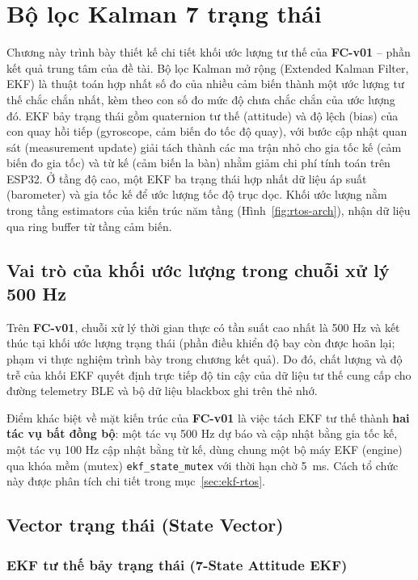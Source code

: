\chapter{Bộ lọc Kalman 7 trạng thái}

Chương này trình bày thiết kế chi tiết khối ước lượng tư thế của \textbf{FC-v01} -- phần kết quả trung tâm của đề tài. Bộ lọc Kalman mở rộng (Extended Kalman Filter, EKF) là thuật toán hợp nhất số đo của nhiều cảm biến thành một ước lượng tư thế chắc chắn nhất, kèm theo con số đo mức độ chưa chắc chắn của ước lượng đó. EKF bảy trạng thái gồm quaternion tư thế (attitude) và độ lệch (bias) của con quay hồi tiếp (gyroscope, cảm biến đo tốc độ quay), với bước cập nhật quan sát (measurement update) giải tách thành các ma trận nhỏ cho gia tốc kế (cảm biến đo gia tốc) và từ kế (cảm biến la bàn) nhằm giảm chi phí tính toán trên ESP32. Ở tầng độ cao, một EKF ba trạng thái hợp nhất dữ liệu áp suất (barometer) và gia tốc kế để ước lượng tốc độ trục dọc. Khối ước lượng nằm trong tầng estimators của kiến trúc năm tầng (Hình~\ref{fig:rtos-arch}), nhận dữ liệu qua ring buffer từ tầng cảm biến.

\section{Vai trò của khối ước lượng trong chuỗi xử lý 500 Hz}

Trên \textbf{FC-v01}, chuỗi xử lý thời gian thực có tần suất cao nhất là 500 Hz và kết thúc tại khối ước lượng trạng thái (phần điều khiển độ bay còn được hoãn lại; phạm vi thực nghiệm trình bày trong chương kết quả). Do đó, chất lượng và độ trễ của khối EKF quyết định trực tiếp độ tin cậy của dữ liệu tư thế cung cấp cho đường telemetry BLE và bộ dữ liệu blackbox ghi trên thẻ nhớ.

Điểm khác biệt về mặt kiến trúc của \textbf{FC-v01} là việc tách EKF tư thế thành \textbf{hai tác vụ bất đồng bộ}: một tác vụ 500 Hz dự báo và cập nhật bằng gia tốc kế, một tác vụ 100 Hz cập nhật bằng từ kế, dùng chung một bộ máy EKF (engine) qua khóa mềm (mutex) \texttt{ekf\_state\_mutex} với thời hạn chờ 5~ms. Cách tổ chức này được phân tích chi tiết trong mục~\ref{sec:ekf-rtos}.

\section{Vector trạng thái (State Vector)}

\subsection{EKF tư thế bảy trạng thái (7-State Attitude EKF)}

